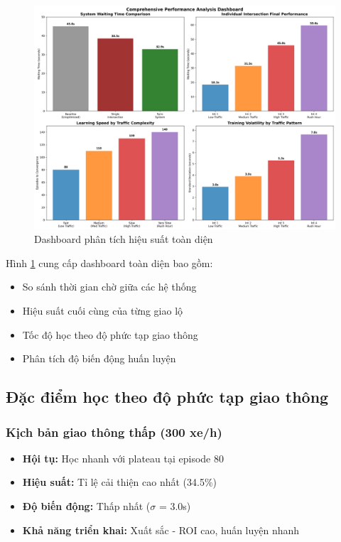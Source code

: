 \begin{figure}[!htp]
    \centering
    \includegraphics[width=\textwidth]{figures/03_performance_dashboard.png}
    \caption{Dashboard phân tích hiệu suất toàn diện}
    \label{fig:performance_dashboard}
\end{figure}

Hình \ref{fig:performance_dashboard} cung cấp dashboard toàn diện bao gồm:
\begin{itemize}
    \item So sánh thời gian chờ giữa các hệ thống
    \item Hiệu suất cuối cùng của từng giao lộ
    \item Tốc độ học theo độ phức tạp giao thông
    \item Phân tích độ biến động huấn luyện
\end{itemize}

\subsection{Đặc điểm học theo độ phức tạp giao thông}

\subsubsection{Kịch bản giao thông thấp (300 xe/h)}
\begin{itemize}
    \item \textbf{Hội tụ:} Học nhanh với plateau tại episode 80
    \item \textbf{Hiệu suất:} Tỉ lệ cải thiện cao nhất (34.5\%)
    \item \textbf{Độ biến động:} Thấp nhất ($\sigma$ = 3.0s)
    \item \textbf{Khả năng triển khai:} Xuất sắc - ROI cao, huấn luyện nhanh
\end{itemize}

